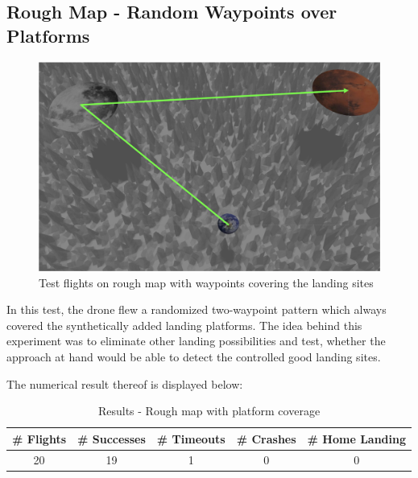 \subsection{Rough Map - Random Waypoints over Platforms}\label{subsec:rough_coverage}
        \begin{figure}[h]
            \centering
            \includegraphics[scale=0.24]{images/evaluation/rough_over_platforms.png}
            \caption{Test flights on rough map with waypoints covering the landing sites}
            \label{fig:rough_covered}
        \end{figure}

        In this test, the drone flew a randomized two-waypoint pattern which always covered the synthetically added landing platforms. The idea behind this experiment was to eliminate other landing possibilities and test, whether the approach at hand would be able to detect the controlled good landing sites.

        The numerical result thereof is displayed below:

        \begin{table}[h]
            \begin{center}
             \caption{Results - Rough map with platform coverage}\vspace{1ex}
             \label{tab:result_rough_covered}
             \begin{tabular}{|c|c|c|c|c|}
             \hline
             \# Flights & \# Successes & \# Timeouts & \# Crashes & \# Home Landing\\ \hline \hline
             20 & 19 & 1 & 0 & 0 \\
             \hline
             \end{tabular}
            \end{center}
        \end{table}

